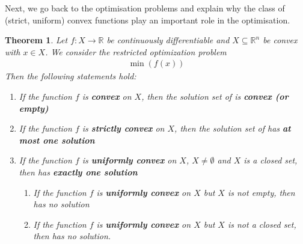 \documentclass[a4paper, 11pt]{report}
\theoremstyle{break}
\newtheorem{theorem}[definition]{Theorem}
\theoremstyle{proofstyle}
\newcommand{\R}{\mathbb{R}}
\begin{document}
Next, we go back to the optimisation problems and explain why the class of (strict, uniform) convex functions play an important role in the optimisation. 
\begin{theorem} \label{theorem:4}
	Let $f:X\rightarrow\R$ be continuously differentiable and $X\subseteq\R^n$ be convex with $x\in X$. We consider the restricted optimization problem
	 \begin{align}
	     \min (f(x))  \label{theorem:5:opt}
	 \end{align}	
	Then the following statements hold:
	\begin{enumerate}
	    \item If the function $f$ is \textbf{convex} on $X$, then the solution set of  is \textbf{convex (or empty)}
	    \item If the function $f$ is \textbf{strictly convex} on $X$, then the solution set of  has \textbf{at most one solution} 
	    \item If the function $f$ is \textbf{uniformly convex} on $X$, $X \neq \emptyset$ and $X$ is a closed set, then  has \textbf{exactly one solution}
	    \begin{enumerate}
	    	\item If the function $f$ is \textbf{uniformly convex} on $X$ but $X$ is not empty, then  has no solution
	    	\item If the function $f$ is \textbf{uniformly convex} on $X$ but $X$ is not a closed set, then  has no solution.
	    \end{enumerate}\subitem 
	\end{enumerate}
\end{theorem}
\end{document}
